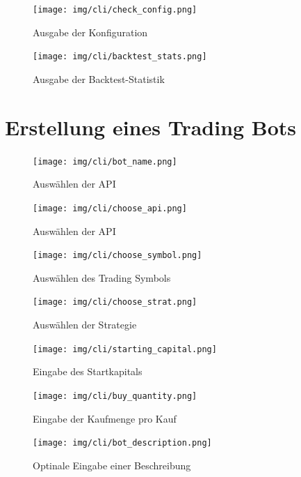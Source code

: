 \documentclass[oneside]{ausarbeitung}
\begin{document}
\begin{figure}[H]
  \centering
  \texttt{[image: img/cli/check\_config.png]}
  \caption{Ausgabe der Konfiguration}
  \label{fig:}
\end{figure}

\begin{figure}[H]
  \centering
  \texttt{[image: img/cli/backtest\_stats.png]}
  \caption{Ausgabe der Backtest-Statistik}
  \label{fig:}
\end{figure}

\section{Erstellung eines Trading Bots}
\label{sec:erstellung_eines_trading_bots}

\begin{figure}[H]
  \centering
  \texttt{[image: img/cli/bot\_name.png]}
  \caption{Auswählen der API}
  \label{fig:}
\end{figure}

\begin{figure}[H]
  \centering
  \texttt{[image: img/cli/choose\_api.png]}
  \caption{Auswählen der API}
  \label{fig:}
\end{figure}

\begin{figure}[H]
  \centering
  \texttt{[image: img/cli/choose\_symbol.png]}
  \caption{Auswählen des Trading Symbols}
  \label{fig:}
\end{figure}

\begin{figure}[H]
  \centering
  \texttt{[image: img/cli/choose\_strat.png]}
  \caption{Auswählen der Strategie}
  \label{fig:}
\end{figure}

\begin{figure}[H]
  \centering
  \texttt{[image: img/cli/starting\_capital.png]}
  \caption{Eingabe des Startkapitals}
  \label{fig:}
\end{figure}

\begin{figure}[H]
  \centering
  \texttt{[image: img/cli/buy\_quantity.png]}
  \caption{Eingabe der Kaufmenge pro Kauf}
  \label{fig:}
\end{figure}

\begin{figure}[H]
  \centering
  \texttt{[image: img/cli/bot\_description.png]}
  \caption{Optinale Eingabe einer Beschreibung}
  \label{fig:}
\end{figure}
\end{document}
